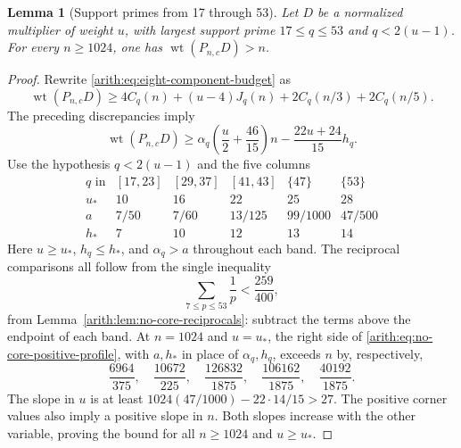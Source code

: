 \documentclass[11pt]{article}
\DeclareMathOperator{\wt}{wt}\DeclareMathOperator{\ord}{ord}
\numberwithin{equation}{section}
\newtheorem{lemma}[theorem]{Lemma}
\theoremstyle{definition}\newtheorem{definition}[theorem]{Definition}
\theoremstyle{remark}\newtheorem{remark}[theorem]{Remark}
\begin{document}
\begin{lemma}[Support primes from 17 through 53]
\label{arith:lem:no-core-small-primes}
Let $D$ be a normalized multiplier of weight $u$, with
largest support prime $17\le q\le53$ and $q<2(u-1)$.
For every $n\ge1024$, one has $\wt(P_{n,c}D)>n$.
\end{lemma}
\begin{proof}
Rewrite \eqref{arith:eq:eight-component-budget} as
\[
 \wt(P_{n,c}D)\ge
 4C_q(n)+(u-4)J_q(n)+2C_q(n/3)+2C_q(n/5).
\]
The preceding discrepancies imply
\begin{equation}\label{arith:eq:no-core-positive-profile}
 \wt(P_{n,c}D)\ge
 \alpha_q\left(\frac u2+\frac{46}{15}\right)n
                      -\frac{22u+24}{15}h_q.
\end{equation}
Use the hypothesis $q<2(u-1)$ and the five columns
\[
\begin{array}{c|rrrrr}
q\text{ in}&[17,23]&[29,37]&[41,43]&\{47\}&\{53\}\\\hline
u_*&10&16&22&25&28\\
a&7/50&7/60&13/125&99/1000&47/500\\
h_*&7&10&12&13&14
\end{array}
\]
Here $u\ge u_*$, $h_q\le h_*$, and $\alpha_q>a$ throughout each
band.  The reciprocal comparisons all follow from the single inequality
\[
                  \sum_{7\le p\le53}\frac1p<\frac{259}{400},
\]
from Lemma~\ref{arith:lem:no-core-reciprocals}: subtract the terms
above the endpoint of each band.
At $n=1024$ and $u=u_*$, the right side of
\eqref{arith:eq:no-core-positive-profile}, with $a,h_*$ in place of $\alpha_q,h_q$,
exceeds $n$ by, respectively,
\[
 \frac{6964}{375},\quad\frac{10672}{225},\quad\frac{126832}{1875},\quad
 \frac{106162}{1875},\quad \frac{40192}{1875}.
\]
The slope in $u$ is at least
$1024(47/1000)-22\cdot14/15>27$.
The positive corner values also imply a positive slope in $n$.
Both slopes increase with the other variable, proving the bound
for all $n\ge1024$ and $u\ge u_*$. 
\end{proof}
\end{document}
